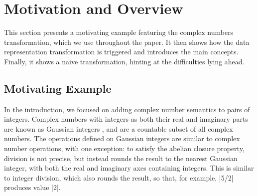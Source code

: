 \vspace{-0.9em}

\section{Motivation and Overview}
\label{sec:problem}

\vspace{-0.2em}

This section presents a motivating example featuring the complex numbers transformation, which we use throughout the paper. It then shows how the data representation transformation is triggered and introduces the main concepts. Finally, it shows a naive transformation, hinting at the difficulties lying ahead.

\vspace{-0.6em}

\subsection{Motivating Example}

\vspace{-0.2em}

In the introduction, we focused on adding complex number semantics to
pairs of integers. Complex numbers with integers as both their real
and imaginary parts are known as Gaussian integers
\cite{gauss1828theoria,gaussian-integers-wikipedia}, and are a
countable subset of all complex numbers. The operations defined on
Gaussian integers are similar to complex number operations, with one
exception: to satisfy the abelian closure property, division is not precise,
but instead rounds the result to the nearest Gaussian integer, with both the real and imaginary
axes containing integers. This is similar to integer division, which
also rounds the result, so that, for example, |5/2| produces value
|2|.


